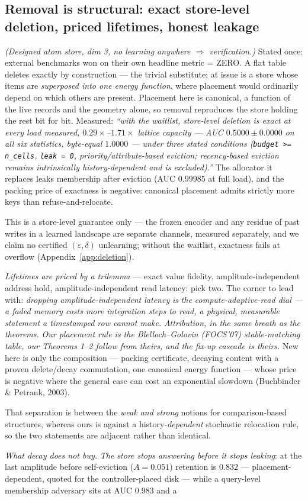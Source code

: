 \subsection{Removal is structural: exact store-level deletion, priced lifetimes, honest leakage}\label{sec:deletion}

\emph{(Designed atom store, dim 3, no learning anywhere $\Rightarrow$ verification.)} Stated once: external benchmarks won on their own headline metric = ZERO. A flat table deletes exactly by construction --- the trivial substitute; at issue is a store whose items are \emph{superposed into one energy function}, where placement would ordinarily depend on which others are present. Placement here is canonical, a function of the live records and the geometry alone, so removal reproduces the store holding the rest bit for bit. Measured: \emph{``with the waitlist, store-level deletion is exact at every load measured, $0.29\times$--$1.71\times$ lattice capacity --- AUC $0.5000\pm0.0000$ on all six statistics, byte-equal $1.0000$ --- under three stated conditions (\texttt{budget >= n\_cells}, \texttt{leak = 0}, priority/attribute-based eviction; recency-based eviction remains intrinsically history-dependent and is excluded).''} The allocator it replaces leaks membership after eviction (AUC $0.99985$ at full load), and the packing price of exactness is negative: canonical placement admits strictly more keys than refuse-and-relocate. {\footnotesize This is a store-level guarantee only --- the frozen encoder and any residue of past writes in a learned landscape are separate channels, measured separately, and we claim no certified $(\varepsilon,\delta)$ unlearning; without the waitlist, exactness fails at overflow (Appendix~\ref{app:deletion}).\par} \emph{Lifetimes are priced by a trilemma} --- exact value fidelity, amplitude-independent address hold, amplitude-independent read latency: pick two. The corner to lead with: \emph{dropping amplitude-independent latency} \emph{is} \emph{the compute-adaptive-read dial --- a faded memory costs more integration steps to read, a physical, measurable statement a timestamped row cannot make.} \emph{Attribution, in the same breath as the theorems.} \emph{Our placement rule is the Blelloch--Golovin (FOCS'07) stable-matching table, our Theorems 1--2 follow from theirs, and the fix-up cascade is theirs.} New here is only the composition --- packing certificate, decaying content with a proven delete/decay commutation, one canonical energy function --- whose price is negative where the general case can cost an exponential slowdown (Buchbinder \& Petrank, 2003). {\footnotesize That separation is between the \emph{weak and strong} notions for comparison-based structures, whereas ours is against a history-\emph{dependent} stochastic relocation rule, so the two statements are adjacent rather than identical.\par} \emph{What decay does not buy.} \emph{The store stops answering before it stops leaking}: at the last amplitude before self-eviction ($A=0.051$) retention is $0.832$ --- placement-dependent, quoted for the controller-placed disk --- while a query-level membership adversary sits at AUC $0.983$ and a 
